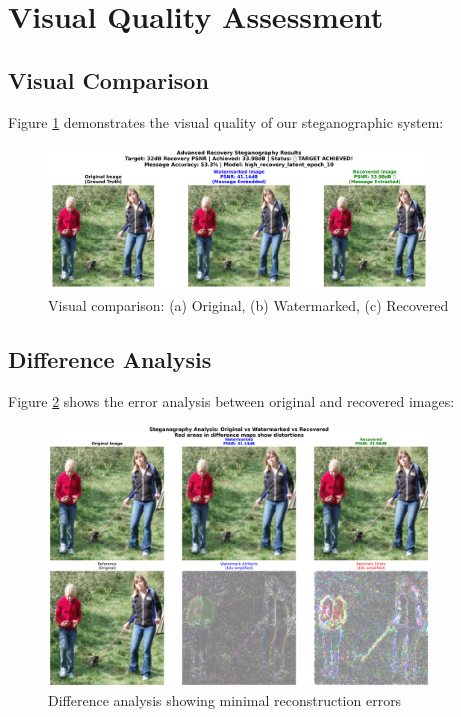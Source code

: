 \documentclass[12pt,a4paper]{report}
\begin{document}
\section{Visual Quality Assessment}

\subsection{Visual Comparison}

Figure \ref{fig:visual_comparison} demonstrates the visual quality of our steganographic system:

\begin{figure}[H]
    \centering
    \includegraphics[width=0.9\textwidth]{figures/visual_comparison.png}
    \caption{Visual comparison: (a) Original, (b) Watermarked, (c) Recovered}
    \label{fig:visual_comparison}
\end{figure}

\subsection{Difference Analysis}

Figure \ref{fig:difference_analysis} shows the error analysis between original and recovered images:

\begin{figure}[H]
    \centering
    \includegraphics[width=0.9\textwidth]{figures/difference_analysis.png}
    \caption{Difference analysis showing minimal reconstruction errors}
    \label{fig:difference_analysis}
\end{figure}
\end{document}
